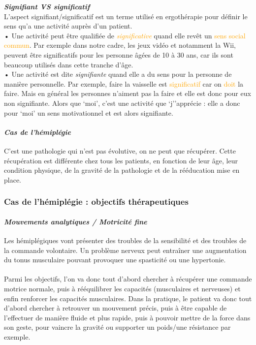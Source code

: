 	\textbf{\emph{Signifiant VS significatif}\\}
L’aspect signifiant/significatif est un terme utilisé en ergothérapie pour définir le sens qu'a une activité auprès d’un patient.\\
• Une activité peut être qualifiée de \emph{\textcolor{orange}{significative}} quand elle revêt un \textcolor{orange}{sens social commun}. Par exemple dans notre cadre, les jeux vidéo et notamment la Wii, peuvent être significatifs pour les personne âgées de 10 à 30 ans, car ils sont beaucoup utilisés dans cette tranche d'âge.\\
• Une activité est dite \emph{\textcolor{vert}{signifiante}} quand elle a du sens pour la personne de \textcolor{vert}{manière personnelle}. Par exemple, faire la vaisselle est \textcolor{orange}{significatif }car on \textcolor{orange}{doit} la faire. Mais en général les personnes n’aiment pas la faire et elle est donc pour eux non signifiante. Alors que ‘moi’, c'est une activité que ‘j’’apprécie :  elle a donc pour ‘moi’ un sens motivationnel et est alors signifiante.

	\paragraph{\emph{Cas de l’hémiplégie} \\}
C’est une pathologie qui n’est pas évolutive, on ne peut que récupérer. Cette récupération est différente chez tous les patients, en fonction de leur âge, leur condition physique, de la gravité de la pathologie et de la rééducation mise en place.

	\subsubsection*{Cas de l'hémiplégie : objectifs thérapeutiques}
\paragraph{\emph{Mouvements analytiques / Motricité fine} \\ }
Les hémiplégiques vont présenter des troubles de la sensibilité et des troubles de la commande volontaire. Un problème nerveux peut entraîner une augmentation du tonus musculaire pouvant provoquer une spasticité ou une hypertonie. 

\paragraph{}
Parmi les objectifs, l’on va donc tout d’abord chercher à récupérer une commande motrice normale, puis à rééquilibrer les capacités (musculaires et nerveuses) et enfin renforcer les capacités musculaires. Dans la pratique, le patient va donc tout d’abord chercher à retrouver un mouvement précis, puis à être capable de l’effectuer de manière fluide et plus rapide, puis à pouvoir mettre de la force dans son geste, pour vaincre la gravité ou supporter un poids/une résistance par exemple.

